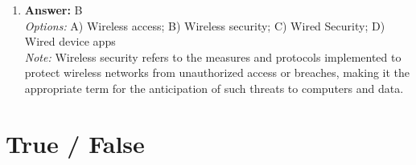 \documentclass[12pt]{article}
\begin{document}
\begin{enumerate}[label=\arabic*.]
\\ \textit{Note:} The Deep Web refers to parts of the internet that are not indexed by traditional search engines, making them inaccessible to standard search queries, which is why it is the correct answer to the question.
\item \textbf{Answer:} B
\\ \textit{Options:} A) Wireless access; B) Wireless security; C) Wired Security; D) Wired device apps
\\ \textit{Note:} Wireless security refers to the measures and protocols implemented to protect wireless networks from unauthorized access or breaches, making it the appropriate term for the anticipation of such threats to computers and data.
\end{enumerate}

\section*{True / False}
\end{document}
